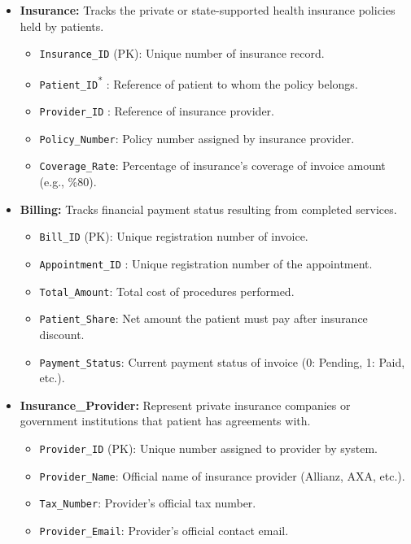 \documentclass[12pt,a4paper]{article}
\begin{document}
\begin{itemize}[label=\textbf{--}]
	\item \textbf{Insurance:} Tracks the private or state-supported health insurance policies held by patients. \begin{itemize}[label=$\bullet$] \item \texttt{Insurance\_ID} (PK): Unique number of insurance record.
		      \item \texttt{Patient\_ID}\textsuperscript{*} : Reference of patient to whom the policy belongs.
		      \item \texttt{Provider\_ID} : Reference of insurance provider.
		      \item \texttt{Policy\_Number}: Policy number assigned by insurance provider.
		      \item \texttt{Coverage\_Rate}: Percentage of insurance's coverage of invoice amount (e.g., \%80).
	      \end{itemize}

	\item \textbf{Billing:} Tracks financial payment status resulting from completed services.
	      \begin{itemize}[label=$\bullet$]
		      \item \texttt{Bill\_ID} (PK): Unique registration number of invoice.
		      \item \texttt{Appointment\_ID} : Unique registration number of the appointment.
		      \item \texttt{Total\_Amount}: Total cost of procedures performed.
		      \item \texttt{Patient\_Share}: Net amount the patient must pay after insurance discount.
		      \item \texttt{Payment\_Status}: Current payment status of invoice (0: Pending, 1: Paid, etc.).
	      \end{itemize}

	\item \textbf{Insurance\_Provider:} Represent private insurance companies or government institutions that patient has agreements with.
	      \begin{itemize}[label=$\bullet$]
		      \item \texttt{Provider\_ID} (PK): Unique number assigned to provider by system.
		      \item \texttt{Provider\_Name}: Official name of insurance provider (Allianz, AXA, etc.).
		      \item \texttt{Tax\_Number}: Provider's official tax number.
		      \item \texttt{Provider\_Email}: Provider's official contact email.
	      \end{itemize}


\end{itemize}
\end{document}
